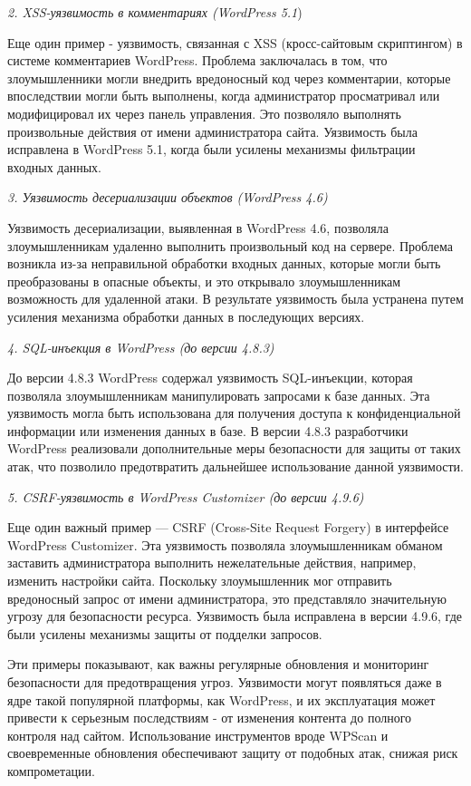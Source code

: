 \emph{2. XSS-уязвимость в комментариях (WordPress 5.1})

Еще один пример - уязвимость, связанная с XSS (кросс-сайтовым
скриптингом) в системе комментариев WordPress. Проблема заключалась в
том, что злоумышленники могли внедрить вредоносный код через
комментарии, которые впоследствии могли быть выполнены, когда
администратор просматривал или модифицировал их через панель управления.
Это позволяло выполнять произвольные действия от имени администратора
сайта. Уязвимость была исправлена в WordPress 5.1, когда были усилены
механизмы фильтрации входных данных.

\emph{3. Уязвимость десериализации объектов (WordPress 4.6)}

Уязвимость десериализации, выявленная в WordPress 4.6, позволяла
злоумышленникам удаленно выполнить произвольный код на сервере. Проблема
возникла из-за неправильной обработки входных данных, которые могли быть
преобразованы в опасные объекты, и это открывало злоумышленникам
возможность для удаленной атаки. В результате уязвимость была устранена
путем усиления механизма обработки данных в последующих версиях.

\emph{4. SQL-инъекция в WordPress (до версии 4.8.3)}

До версии 4.8.3 WordPress содержал уязвимость SQL-инъекции, которая
позволяла злоумышленникам манипулировать запросами к базе данных. Эта
уязвимость могла быть использована для получения доступа к
конфиденциальной информации или изменения данных в базе. В версии 4.8.3
разработчики WordPress реализовали дополнительные меры безопасности для
защиты от таких атак, что позволило предотвратить дальнейшее
использование данной уязвимости.

\emph{5. CSRF-уязвимость в WordPress Customizer (до версии 4.9.6)}

Еще один важный пример --- CSRF (Cross-Site Request Forgery) в
интерфейсе WordPress Customizer. Эта уязвимость позволяла
злоумышленникам обманом заставить администратора выполнить нежелательные
действия, например, изменить настройки сайта. Поскольку злоумышленник
мог отправить вредоносный запрос от имени администратора, это
представляло значительную угрозу для безопасности ресурса. Уязвимость
была исправлена в версии 4.9.6, где были усилены механизмы защиты от
подделки запросов.

Эти примеры показывают, как важны регулярные обновления и мониторинг
безопасности для предотвращения угроз. Уязвимости могут появляться даже
в ядре такой популярной платформы, как WordPress, и их эксплуатация
может привести к серьезным последствиям - от изменения контента до
полного контроля над сайтом. Использование инструментов вроде WPScan и
своевременные обновления обеспечивают защиту от подобных атак, снижая
риск компрометации.

